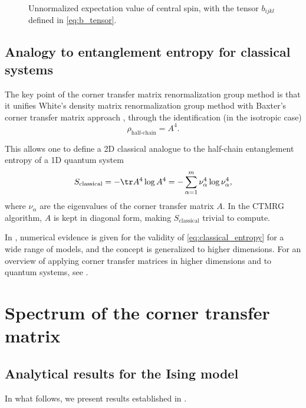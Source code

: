 \begin{figure}
  
  \caption{Unnormalized expectation value of central spin, with the tensor $b_{i j k l}$ defined in \autoref{eq:b_tensor}.}
  \label{fig:magnetization_central_spin_tensor_network}
\end{figure}

\subsection{Analogy to entanglement entropy for classical systems}
The key point of the corner transfer matrix renormalization group method \cite{nishino1997corner, nishino1996corner} is
that it unifies White's density matrix renormalization group method \cite{white1992density} with Baxter's corner
transfer matrix approach \cite{baxter1968dimers, baxter1978variational}, through the identification (in the isotropic
case)
\begin{equation}\label{eq:correspondence_density_matrix_ctm}
  \rho_{\text{half-chain}} = A^4.
\end{equation}

This allows one to define a 2D classical analogue to the half-chain entanglement entropy of a 1D quantum system
\begin{equation}\label{eq:classical_entropy}
  S_{\text{classical}} = - \tr A^4 \log A^4 = - \sum_{\alpha=1}^{m} \nu_{\alpha}^4 \log \nu_{\alpha}^4,
\end{equation}
where $\nu_{\alpha}$ are the eigenvalues of the corner transfer matrix $A$.
In the CTMRG algorithm, $A$ is kept in diagonal form, making $S_{\text{classical}}$ trivial to compute.

In \cite{huang2017holographic}, numerical evidence is given for the validity of \autoref{eq:classical_entropy} for a
wide range of models, and the concept is generalized to higher dimensions. For an overview of applying corner transfer
matrices in higher dimensions and to quantum systems, see \cite{orus2012exploring}.

\section{Spectrum of the corner transfer matrix}\label{sec:spectrum_of_ctm}

\subsection{Analytical results for the Ising model}
In what follows, we present results established in \cite{peschel2009reduced, peschel1999density}.

